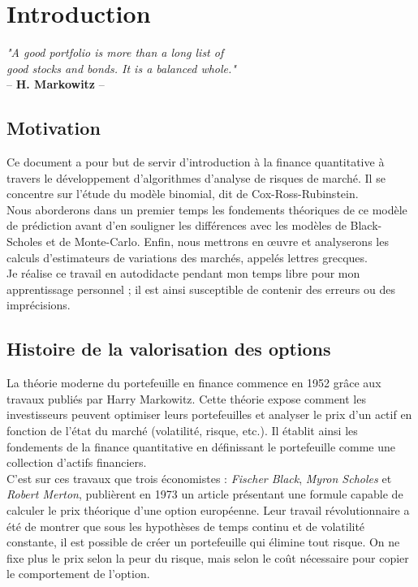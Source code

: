 \section{Introduction}
\vspace{0.5cm}
\begin{center}
    \textit{"A good portfolio is more than a long list of \\
    good stocks and bonds. It is a balanced whole."}\\
    -- \textbf{H. Markowitz} --
\end{center}
\vspace{0.5cm}
    
\subsection{Motivation}
Ce document a pour but de servir d'introduction à la finance quantitative à travers le développement d'algorithmes d'analyse de risques de marché. Il se concentre sur l'étude du modèle binomial, dit de Cox-Ross-Rubinstein. \\

Nous aborderons dans un premier temps les fondements théoriques de ce modèle de prédiction avant d’en souligner les différences avec les modèles de Black-Scholes et de Monte-Carlo. Enfin, nous mettrons en œuvre et analyserons les calculs d’estimateurs de variations des marchés, appelés lettres grecques. \\

Je réalise ce travail en autodidacte pendant mon temps libre pour mon apprentissage personnel ; il est ainsi susceptible de contenir des erreurs ou des imprécisions. \\

\subsection{Histoire de la valorisation des options}

La théorie moderne du portefeuille en finance commence en 1952 grâce aux travaux publiés par Harry Markowitz. Cette théorie expose comment les investisseurs peuvent optimiser leurs portefeuilles et analyser le prix d'un actif en fonction de l'état du marché (volatilité, risque, etc.). Il établit ainsi les fondements de la finance quantitative en définissant le portefeuille comme une collection d'actifs financiers. \\

C'est sur ces travaux que trois économistes : \textit{Fischer Black}, \textit{Myron Scholes} et \textit{Robert Merton}, publièrent en 1973 un article présentant une formule capable de calculer le prix théorique d'une option européenne. Leur travail révolutionnaire a été de montrer que sous les hypothèses de temps continu et de volatilité constante, il est possible de créer un portefeuille qui élimine tout risque. On ne fixe plus le prix selon la peur du risque, mais selon le coût nécessaire pour copier le comportement de l'option. \cite{Option} \\

